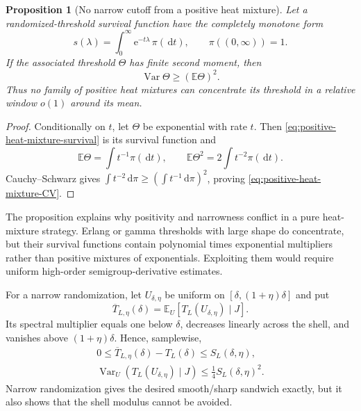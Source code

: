 \documentclass[11pt]{article}
\newtheorem{proposition}[theorem]{Proposition}
\theoremstyle{definition}
\theoremstyle{remark}
\newcommand{\e}{\mathrm e}
\newcommand{\E}{\mathbb E}
\newcommand{\Var}{\operatorname{Var}}
\newcommand{\dd}{\,\mathrm d}
\begin{document}
\begin{proposition}[No narrow cutoff from a positive heat mixture]
\label{prop:positive-heat-mixture-no-go}
Let a randomized-threshold survival function have the completely monotone form
\begin{equation}
 s(\lambda)=\int_0^\infty\e^{-t\lambda}\,\pi(\dd t),
 \qquad \pi((0,\infty))=1.
 \label{eq:positive-heat-mixture-survival}
\end{equation}
If the associated threshold $\Theta$ has finite second moment, then
\begin{equation}
 \boxed{\Var\Theta\ge(\E\Theta)^2.}
 \label{eq:positive-heat-mixture-CV}
\end{equation}
Thus no family of positive heat mixtures can concentrate its threshold in a
relative window $o(1)$ around its mean.
\end{proposition}

\begin{proof}
Conditionally on $t$, let $\Theta$ be exponential with rate $t$.
Then \eqref{eq:positive-heat-mixture-survival} is its survival function and
\[
 \E\Theta=\int t^{-1}\pi(\dd t),\qquad
 \E\Theta^2=2\int t^{-2}\pi(\dd t).
\]
Cauchy--Schwarz gives
$\int t^{-2}\dd\pi\ge(\int t^{-1}\dd\pi)^2$, proving
\eqref{eq:positive-heat-mixture-CV}.
\end{proof}

The proposition explains why positivity and narrowness conflict in a pure
heat-mixture strategy.  Erlang or gamma thresholds with large shape do
concentrate, but their survival functions contain polynomial times exponential
multipliers rather than positive mixtures of exponentials.  Exploiting them
would require uniform high-order semigroup-derivative estimates.

For a narrow randomization, let $U_{\delta,\eta}$ be uniform on
$[\delta,(1+\eta)\delta]$ and put
\begin{equation}
 \overline T_{L,\eta}(\delta)
 =\E_U[T_L(U_{\delta,\eta})\mid J].
 \label{eq:uniform-randomized-tail}
\end{equation}
Its spectral multiplier equals one below $\delta$, decreases linearly across
the shell, and vanishes above $(1+\eta)\delta$.  Hence, samplewise,
\begin{align}
 \boxed{0\le\overline T_{L,\eta}(\delta)-T_L(\delta)
 \le S_L(\delta,\eta),}
 \label{eq:uniform-randomized-sandwich}\\
 \boxed{
 \Var_U(T_L(U_{\delta,\eta})\mid J)
 \le\frac14S_L(\delta,\eta)^2.}
 \label{eq:uniform-randomized-variance}
\end{align}
Narrow randomization gives the desired smooth/sharp sandwich exactly, but it
also shows that the shell modulus cannot be avoided.
\end{document}
